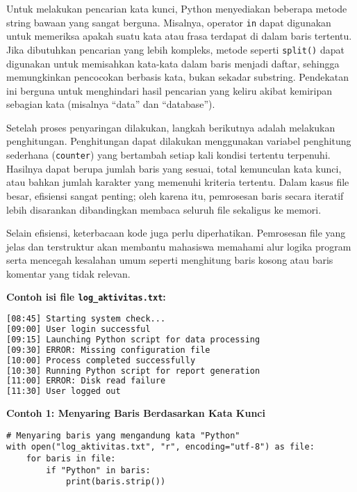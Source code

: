 Untuk melakukan pencarian kata kunci, Python menyediakan beberapa metode string bawaan yang sangat berguna. Misalnya, operator \texttt{in} dapat digunakan untuk memeriksa apakah suatu kata atau frasa terdapat di dalam baris tertentu. Jika dibutuhkan pencarian yang lebih kompleks, metode seperti \texttt{split()} dapat digunakan untuk memisahkan kata-kata dalam baris menjadi daftar, sehingga memungkinkan pencocokan berbasis kata, bukan sekadar substring. Pendekatan ini berguna untuk menghindari hasil pencarian yang keliru akibat kemiripan sebagian kata (misalnya “data” dan “database”).

Setelah proses penyaringan dilakukan, langkah berikutnya adalah melakukan penghitungan. Penghitungan dapat dilakukan menggunakan variabel penghitung sederhana (\texttt{counter}) yang bertambah setiap kali kondisi tertentu terpenuhi. Hasilnya dapat berupa jumlah baris yang sesuai, total kemunculan kata kunci, atau bahkan jumlah karakter yang memenuhi kriteria tertentu. Dalam kasus file besar, efisiensi sangat penting; oleh karena itu, pemrosesan baris secara iteratif lebih disarankan dibandingkan membaca seluruh file sekaligus ke memori.

Selain efisiensi, keterbacaan kode juga perlu diperhatikan. Pemrosesan file yang jelas dan terstruktur akan membantu mahasiswa memahami alur logika program serta mencegah kesalahan umum seperti menghitung baris kosong atau baris komentar yang tidak relevan.

\noindent\textbf{Contoh isi file \texttt{log\_aktivitas.txt}:}

\begin{lstlisting}[language=bash, caption={Cuplikan isi file log_aktivitas.txt}]
[08:45] Starting system check...
[09:00] User login successful
[09:15] Launching Python script for data processing
[09:30] ERROR: Missing configuration file
[10:00] Process completed successfully
[10:30] Running Python script for report generation
[11:00] ERROR: Disk read failure
[11:30] User logged out
\end{lstlisting}

\noindent\textbf{Contoh 1: Menyaring Baris Berdasarkan Kata Kunci}

\begin{lstlisting}[style=PythonStyle, caption={Menyaring baris file yang mengandung kata kunci tertentu}]
# Menyaring baris yang mengandung kata "Python"
with open("log_aktivitas.txt", "r", encoding="utf-8") as file:
    for baris in file:
        if "Python" in baris:
            print(baris.strip())
\end{lstlisting}

